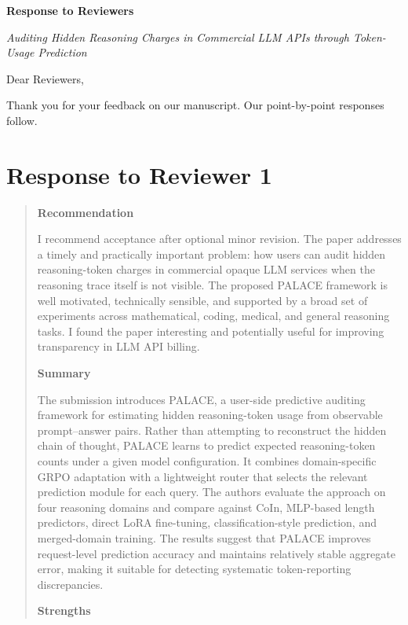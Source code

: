 \documentclass[11pt]{article}
\begin{document}
\begin{center}
{\Large\bfseries Response to Reviewers\par}
\smallskip
\emph{Auditing Hidden Reasoning Charges in Commercial LLM APIs through Token-Usage Prediction}
\end{center}

Dear Reviewers,

Thank you for your feedback on our manuscript. Our point-by-point responses follow.

\section*{Response to Reviewer 1}

\begin{quote}\small
\textbf{Recommendation}

I recommend acceptance after optional minor revision. The paper addresses a timely and practically important problem: how users can audit hidden reasoning-token charges in commercial opaque LLM services when the reasoning trace itself is not visible. The proposed PALACE framework is well motivated, technically sensible, and supported by a broad set of experiments across mathematical, coding, medical, and general reasoning tasks. I found the paper interesting and potentially useful for improving transparency in LLM API billing.

\textbf{Summary}

The submission introduces PALACE, a user-side predictive auditing framework for estimating hidden reasoning-token usage from observable prompt–answer pairs. Rather than attempting to reconstruct the hidden chain of thought, PALACE learns to predict expected reasoning-token counts under a given model configuration. It combines domain-specific GRPO adaptation with a lightweight router that selects the relevant prediction module for each query. The authors evaluate the approach on four reasoning domains and compare against CoIn, MLP-based length predictors, direct LoRA fine-tuning, classification-style prediction, and merged-domain training. The results suggest that PALACE improves request-level prediction accuracy and maintains relatively stable aggregate error, making it suitable for detecting systematic token-reporting discrepancies.

\textbf{Strengths}


\end{quote}
\end{document}
